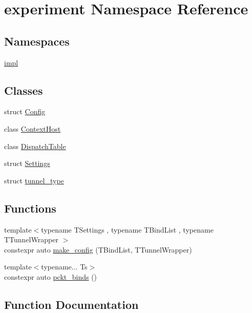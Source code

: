 \hypertarget{namespaceexperiment}{}\section{experiment Namespace Reference}
\label{namespaceexperiment}
\subsection*{Namespaces}
\begin{DoxyCompactItemize}
\item 
 \hyperlink{namespaceexperiment_1_1impl}{impl}
\end{DoxyCompactItemize}
\subsection*{Classes}
\begin{DoxyCompactItemize}
\item 
struct \hyperlink{structexperiment_1_1Config}{Config}
\item 
class \hyperlink{classexperiment_1_1ContextHost}{Context\+Host}
\item 
class \hyperlink{classexperiment_1_1DispatchTable}{Dispatch\+Table}
\item 
struct \hyperlink{structexperiment_1_1Settings}{Settings}
\item 
struct \hyperlink{structexperiment_1_1tunnel__type}{tunnel\+\_\+type}
\end{DoxyCompactItemize}
\subsection*{Functions}
\begin{DoxyCompactItemize}
\item 
{\footnotesize template$<$typename T\+Settings , typename T\+Bind\+List , typename T\+Tunnel\+Wrapper $>$ }\\constexpr auto \hyperlink{namespaceexperiment_ad8b97c6b124889383d6ee7a3de2d0c8d}{make\+\_\+config} (T\+Bind\+List, T\+Tunnel\+Wrapper)
\item 
{\footnotesize template$<$typename... Ts$>$ }\\constexpr auto \hyperlink{namespaceexperiment_a96b5bb0b22be1ffc91e70551dfc28082}{pckt\+\_\+binds} ()
\end{DoxyCompactItemize}


\subsection{Function Documentation}
\hypertarget{namespaceexperiment_ad8b97c6b124889383d6ee7a3de2d0c8d}{}
